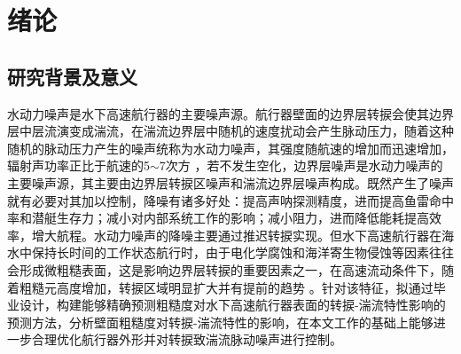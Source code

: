 \chapter{绪论}\label{preface}

\section{研究背景及意义}
水动力噪声是水下高速航行器的主要噪声源。航行器壁面的边界层转捩会使其边界层中层流演变成湍流，在湍流边界层中随机的速度扰动会产生脉动压力，随着这种随机的脉动压力产生的噪声统称为水动力噪声，其强度随航速的增加而迅速增加，辐射声功率正比于航速的5$\sim$7次方 ，若不发生空化，边界层噪声是水动力噪声的主要噪声源，其主要由边界层转捩区噪声和湍流边界层噪声构成。既然产生了噪声就有必要对其加以控制，降噪有诸多好处：提高声呐探测精度，进而提高鱼雷命中率和潜艇生存力；减小对内部系统工作的影响；减小阻力，进而降低能耗提高效率，增大航程。水动力噪声的降噪主要通过推迟转捩实现。但水下高速航行器在海水中保持长时间的工作状态航行时，由于电化学腐蚀和海洋寄生物侵蚀等因素往往会形成微粗糙表面，这是影响边界层转捩的重要因素之一，在高速流动条件下，随着粗糙元高度增加，转捩区域明显扩大并有提前的趋势 。针对该特征，拟通过毕业设计，构建能够精确预测粗糙度对水下高速航行器表面的转捩-湍流特性影响的预测方法，分析壁面粗糙度对转捩-湍流特性的影响，在本文工作的基础上能够进一步合理优化航行器外形并对转捩致湍流脉动噪声进行控制。


